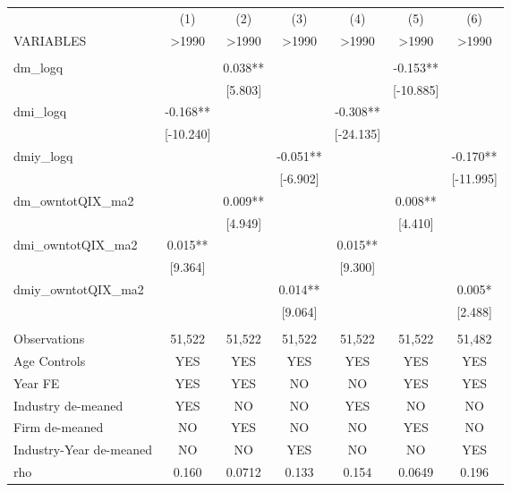 \documentclass[]{article}
\begin{document}
\begin{tabular}{lcccccc} \hline
 & (1) & (2) & (3) & (4) & (5) & (6) \\
VARIABLES & >1990 & >1990 & >1990 & >1990 & >1990 & >1990 \\ \hline
 &  &  &  &  &  &  \\
dm\_logq &  & 0.038** &  &  & -0.153** &  \\
 &  & [5.803] &  &  & [-10.885] &  \\
dmi\_logq & -0.168** &  &  & -0.308** &  &  \\
 & [-10.240] &  &  & [-24.135] &  &  \\
dmiy\_logq &  &  & -0.051** &  &  & -0.170** \\
 &  &  & [-6.902] &  &  & [-11.995] \\
dm\_owntotQIX\_ma2 &  & 0.009** &  &  & 0.008** &  \\
 &  & [4.949] &  &  & [4.410] &  \\
dmi\_owntotQIX\_ma2 & 0.015** &  &  & 0.015** &  &  \\
 & [9.364] &  &  & [9.300] &  &  \\
dmiy\_owntotQIX\_ma2 &  &  & 0.014** &  &  & 0.005* \\
 &  &  & [9.064] &  &  & [2.488] \\
 &  &  &  &  &  &  \\
Observations & 51,522 & 51,522 & 51,522 & 51,522 & 51,522 & 51,482 \\
Age Controls & YES & YES & YES & YES & YES & YES \\
Year FE & YES & YES & NO & NO & YES & YES \\
Industry de-meaned & YES & NO & NO & YES & NO & NO \\
Firm de-meaned & NO & YES & NO & NO & YES & NO \\
Industry-Year de-meaned & NO & NO & YES & NO & NO & YES \\
 rho & 0.160 & 0.0712 & 0.133 & 0.154 & 0.0649 & 0.196 \\ \hline
\end{tabular}
\end{document}
